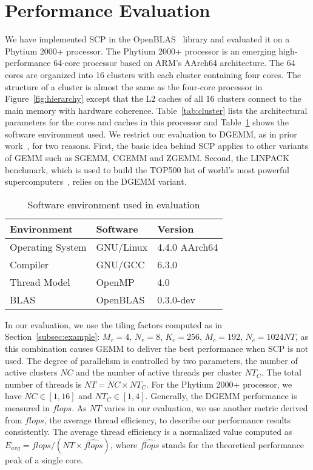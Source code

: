 \section{Performance Evaluation}\label{sec:evaluation}

We have implemented SCP in the OpenBLAS~\cite{openblas} library
and evaluated it on a Phytium 2000+ processor.
The Phytium 2000+ processor is an emerging high-performance
64-core processor based on ARM's AArch64 architecture.
The 64 cores are organized into 16 clusters with each
cluster containing four cores.
The structure of a cluster is almost the same as
the four-core processor in Figure~\ref{fig:hierarchy}
except that the L2 caches of all 16 clusters connect to the main memory
with hardware coherence.
Table~\ref{tab:cluster} lists the
architectural parameters for the cores and caches
in this processor
and Table~\ref{tab:software} shows the software environment used.
We restrict our evaluation to DGEMM,
as in prior work~\cite{blispar,augem,poetmicro}, for two reasons.
First, the basic idea behind SCP applies to other
variants of GEMM such as SGEMM, CGEMM and ZGEMM.
Second, the LINPACK benchmark, which is used to build the
TOP500 list of world's most powerful supercomputers~\cite{top500},
relies on the DGEMM variant.

\begin{table}
  \centering
  \caption{Software environment used in evaluation}
  \label{tab:software}
  \begin{tabular}{lll}
    \toprule
    Environment & Software & Version \\
    \midrule
    Operating System & GNU/Linux & 4.4.0 AArch64 \\
    Compiler & GNU/GCC & 6.3.0 \\
    Thread Model & OpenMP & 4.0 \\
    BLAS & OpenBLAS & 0.3.0-dev \\
    \bottomrule
  \end{tabular}
\end{table}


In our evaluation, we use the tiling factors
computed as in Section~\ref{subsec:example}:
$M_r = 4$, $N_r = 8$, $K_c = 256$, $M_c = 192$, $N_c = 1024NT$,
as this combination causes GEMM to deliver the best performance 
when SCP is not used.
The degree of parallelism is controlled by two parameters,
the number of active clusters $NC$
and the number of active threads per cluster $NT_C$.
The total number of threads is $NT = NC \times NT_C$.
For the Phytium 2000+ processor, we have
$NC \in [1, 16]$ and $NT_C \in [1, 4]$. 
Generally, the DGEMM performance is measured in $flops$.
As $NT$ varies in our evaluation,
we use another metric derived from $flops$,
the average thread efficiency,
to describe our performance results consistently.
The average thread efficiency is a normalized value computed as
$E_{avg} = flops / (NT \times \widehat{flops})$,
where $\widehat{flops}$ stands for the theoretical performance
peak of a single core.

